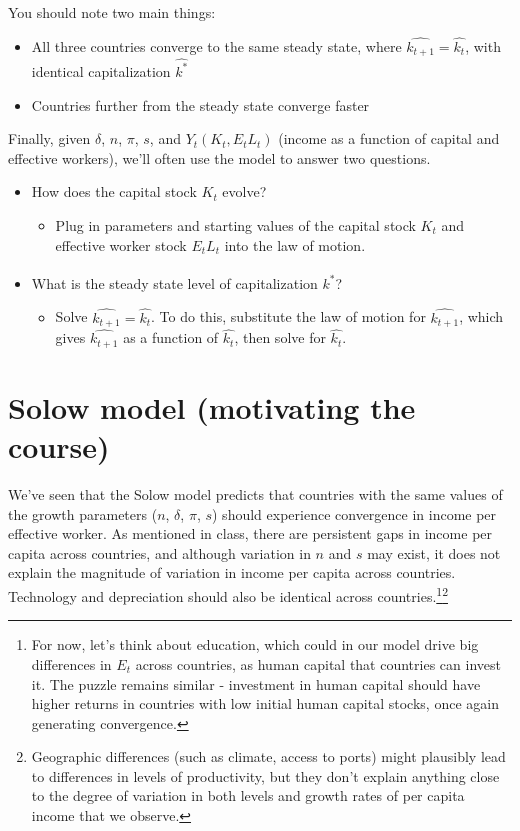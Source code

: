 \documentclass[12pt,english]{article}
\begin{document}
You should note two main things:
\begin{itemize}
	\item All three countries converge to the same steady state, where $\widehat{k_{t + 1}} = \widehat{k_{t}}$, with identical capitalization $\widehat{k^{*}}$
	\item Countries further from the steady state converge faster
\end{itemize}

Finally, given $\delta$, $n$, $\pi$, $s$, and $Y_{t}(K_{t}, E_{t} L_{t})$ (income as a function of capital and effective workers), we'll often use the model to answer two questions.
\begin{itemize}
	\item How does the capital stock $K_{t}$ evolve?
	\begin{itemize}
		\item Plug in parameters and starting values of the capital stock $K_{t}$ and effective worker stock $E_{t} L_{t}$ into the law of motion.
	\end{itemize}
	\item What is the steady state level of capitalization $\widehat{k^{*}}$?
	\begin{itemize}
		\item Solve $\widehat{k_{t + 1}} = \widehat{k_{t}}$. To do this, substitute the law of motion for $\widehat{k_{t + 1}}$, which gives $\widehat{k_{t + 1}}$ as a function of $\widehat{k_{t}}$, then solve for $\widehat{k_{t}}$.
	\end{itemize}
\end{itemize}

\section{Solow model (motivating the course)}

We've seen that the Solow model predicts that countries with the same values of the growth parameters ($n$, $\delta$, $\pi$, $s$) should experience convergence in income per effective worker. As mentioned in class, there are persistent gaps in income per capita across countries, and although variation in $n$ and $s$ may exist, it does not explain the magnitude of variation in income per capita across countries. Technology and depreciation should also be identical across countries.\footnote{For now, let's think about education, which could in our model drive big differences in $E_{t}$ across countries, as human capital that countries can invest it. The puzzle remains similar - investment in human capital should have higher returns in countries with low initial human capital stocks, once again generating convergence.}\footnote{Geographic differences (such as climate, access to ports) might plausibly lead to differences in levels of productivity, but they don't explain anything close to the degree of variation in both levels and growth rates of per capita income that we observe.}
\end{document}
